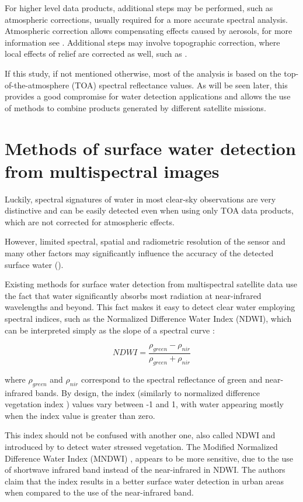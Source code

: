 For higher level data products, additional steps may be performed, such as atmospheric corrections, usually required for a more accurate spectral analysis. Atmospheric correction allows compensating effects caused by aerosols, for more information see \citep{gao2006review}. Additional steps may involve topographic correction, where local effects of relief are corrected as well, such as \citep{Tan2013}.

If this study, if not mentioned otherwise, most of the analysis is based on the top-of-the-atmosphere (TOA) spectral reflectance values. As will be seen later, this provides a good compromise for water detection applications and allows the use of methods to combine products generated by different satellite missions.

\section{Methods of surface water detection from multispectral images}

Luckily, spectral signatures of water in most clear-sky observations are very distinctive and can be easily detected even when using only TOA data products, which are not corrected for atmospheric effects. 

However, limited spectral, spatial and radiometric resolution of the sensor and many other factors may significantly influence the accuracy of the detected surface water (\citep{Ji2009}).

Existing methods for surface water detection from multispectral satellite data use the fact that water significantly absorbs most radiation at near-infrared wavelengths and beyond. This fact makes it easy to detect clear water employing spectral indices, such as the Normalized Difference Water Index (NDWI), which can be interpreted simply as the slope of a spectral curve \citep{McFeeters1996}:

\begin{equation}
NDWI =  \frac{\rho_{green} - \rho_{nir}}{\rho_{green} + \rho_{nir}} 
\label{eq:index_NDWI}
\end{equation}

where $\rho_{green}$ and $\rho_{nir}$ correspond to the spectral reflectance of green and near-infrared bands. By design, the index (similarly to normalized difference vegetation index \citep{rouse1974monitoring}) values vary between -1 and 1, with water appearing mostly when the index value is greater than zero.

This index should not be confused with another one, also called NDWI and introduced by \citep{Gao1996} to detect water stressed vegetation. The Modified Normalized Difference Water Index (MNDWI) \citep{Xu2006}, appears to be more sensitive, due to the use of shortwave infrared band instead of the near-infrared in NDWI. The authors claim that the index results in a better surface water detection in urban areas when compared to the use of the near-infrared band. 

